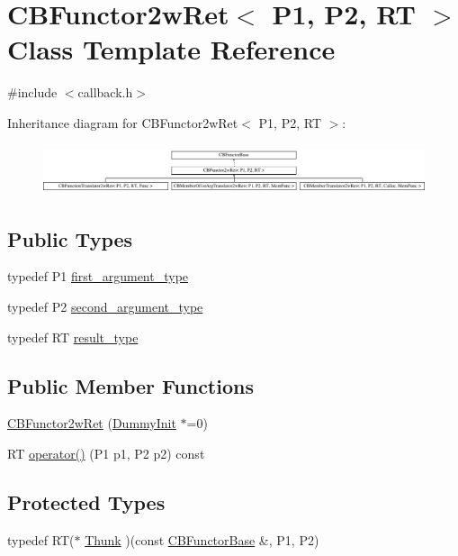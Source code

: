 \hypertarget{class_c_b_functor2w_ret}{\section{C\+B\+Functor2w\+Ret$<$ P1, P2, R\+T $>$ Class Template Reference}
\label{class_c_b_functor2w_ret}
}


{\ttfamily \#include $<$callback.\+h$>$}

Inheritance diagram for C\+B\+Functor2w\+Ret$<$ P1, P2, R\+T $>$\+:\begin{figure}[H]
\begin{center}
\leavevmode
\includegraphics[height=1.485411cm]{class_c_b_functor2w_ret}
\end{center}
\end{figure}
\subsection*{Public Types}
\begin{DoxyCompactItemize}
\item 
typedef P1 \hyperlink{class_c_b_functor2w_ret_a7d24bfcc6aa65aa4b55b5e959a004dd4}{first\+\_\+argument\+\_\+type}
\item 
typedef P2 \hyperlink{class_c_b_functor2w_ret_ab581d0954897537b10bf2de447b8b657}{second\+\_\+argument\+\_\+type}
\item 
typedef R\+T \hyperlink{class_c_b_functor2w_ret_a9d2ef5e7ee4eaac99bea7abfdd21af82}{result\+\_\+type}
\end{DoxyCompactItemize}
\subsection*{Public Member Functions}
\begin{DoxyCompactItemize}
\item 
\hyperlink{class_c_b_functor2w_ret_adba50ddb99c70b46584e4c479731264e}{C\+B\+Functor2w\+Ret} (\hyperlink{class_c_b_functor_base_1_1_dummy_init}{Dummy\+Init} $\ast$=0)
\item 
R\+T \hyperlink{class_c_b_functor2w_ret_ac6c5aa2cc0ec49461fef4031c2550121}{operator()} (P1 p1, P2 p2) const 
\end{DoxyCompactItemize}
\subsection*{Protected Types}
\begin{DoxyCompactItemize}
\item 
typedef R\+T($\ast$ \hyperlink{class_c_b_functor2w_ret_a550afb1fd40c4dd859c80dfaa830e3aa}{Thunk} )(const \hyperlink{class_c_b_functor_base}{C\+B\+Functor\+Base} \&, P1, P2)
\end{DoxyCompactItemize}

